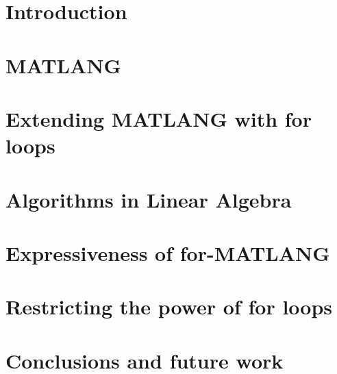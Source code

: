 \documentclass[acmsmall,review]{acmart}
\begin{document}
 




\maketitle

\section{Introduction}



\section{MATLANG}\label{sec:matlang}


\section{Extending MATLANG with for loops}\label{sec:formatlang}



%

\section{Algorithms in Linear Algebra}\label{sec:queries}


\section{Expressiveness of for-MATLANG}\label{sec:circuits}
%



\section{Restricting the power of for loops}\label{sec:restrict}


\section{Conclusions and future work}\label{sec:conclude}

\end{document}
